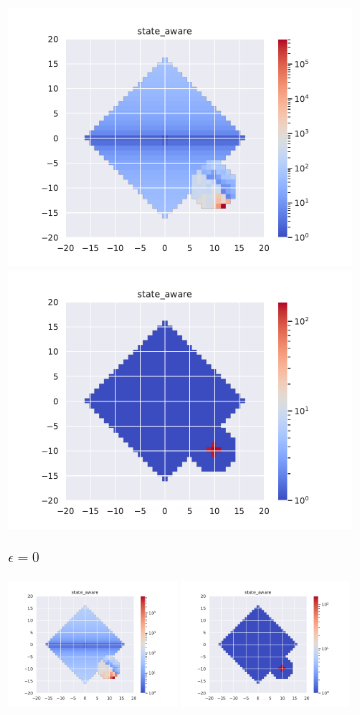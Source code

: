\documentclass{article}
\begin{document}
\begin{figure}[H]
    \centering
    \begin{subfigure}[b]{\textwidth}
        \centering
        \includegraphics[width=0.49\linewidth]{img/epsilon/0/updates_state_aware.pdf}
        \includegraphics[width=0.49\linewidth]{img/epsilon/0/occupations_state_aware.pdf}
        \caption{$\epsilon=0$}
    \end{subfigure}
    \begin{subfigure}[b]{\textwidth}
        \centering
        \includegraphics[width=0.49\textwidth]{img/epsilon/1e-2/updates_state_aware.pdf}
        \includegraphics[width=0.49\textwidth]{img/epsilon/1e-2/occupations_state_aware.pdf}

\end{subfigure}
\end{figure}
\end{document}
